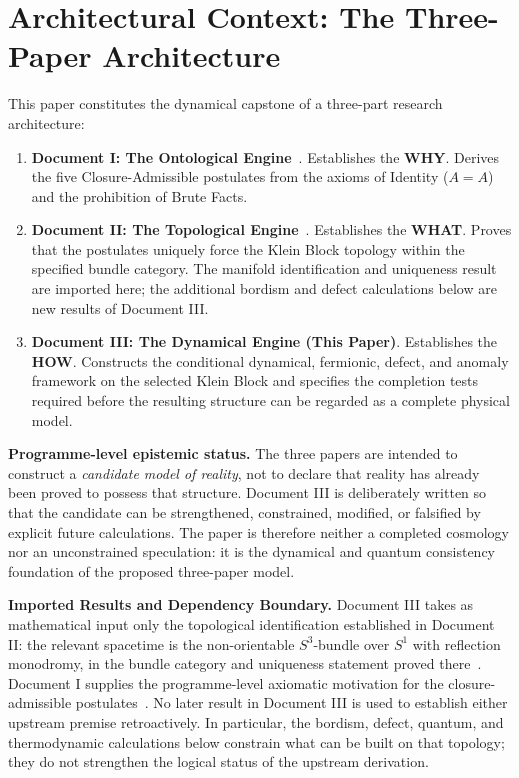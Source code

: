 \documentclass[11pt]{article}
\theoremstyle{canonmath}
\theoremstyle{canonpostulate}
\theoremstyle{canonclaim}
\begin{document}
\section*{Architectural Context: The Three-Paper Architecture}

This paper constitutes the dynamical capstone of a three-part research architecture:

\begin{enumerate}
\item \textbf{Document I: The Ontological Engine}~\cite{CanonWhy}. Establishes the \textbf{WHY}. Derives the five Closure-Admissible postulates from the axioms of Identity ($A=A$) and the prohibition of Brute Facts.
\item \textbf{Document II: The Topological Engine}~\cite{CanonWhat}. Establishes the \textbf{WHAT}. Proves that the postulates uniquely force the Klein Block topology within the specified bundle category. The manifold identification and uniqueness result are imported here; the additional bordism and defect calculations below are new results of Document III.
\item \textbf{Document III: The Dynamical Engine (This Paper)}. Establishes the \textbf{HOW}. Constructs the conditional dynamical, fermionic, defect, and anomaly framework on the selected Klein Block and specifies the completion tests required before the resulting structure can be regarded as a complete physical model.
\end{enumerate}

\newpage
\begin{keyresult}
\textbf{Programme-level epistemic status.} The three papers are intended to construct a \emph{candidate model of reality}, not to declare that reality has already been proved to possess that structure. Document III is deliberately written so that the candidate can be strengthened, constrained, modified, or falsified by explicit future calculations. The paper is therefore neither a completed cosmology nor an unconstrained speculation: it is the dynamical and quantum consistency foundation of the proposed three-paper model.
\end{keyresult}

\begin{keyresult}
\textbf{Imported Results and Dependency Boundary.} Document III takes as mathematical input only the topological identification established in Document II: the relevant spacetime is the non-orientable $S^3$-bundle over $S^1$ with reflection monodromy, in the bundle category and uniqueness statement proved there~\cite{CanonWhat}. Document I supplies the programme-level axiomatic motivation for the closure-admissible postulates~\cite{CanonWhy}. No later result in Document III is used to establish either upstream premise retroactively. In particular, the bordism, defect, quantum, and thermodynamic calculations below constrain what can be built on that topology; they do not strengthen the logical status of the upstream derivation.
\end{keyresult}
\end{document}
